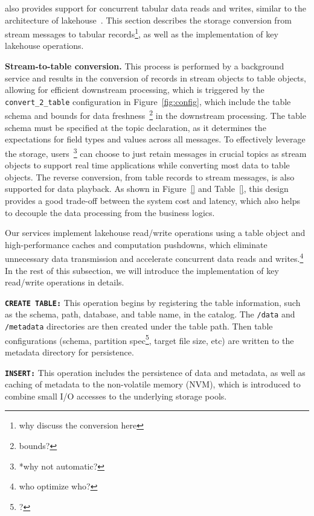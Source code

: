  \sys also provides support for concurrent tabular data reads and writes, similar to  the architecture of lakehouse~\cite{}.
  This section  describes the storage conversion from stream messages to tabular records\footnote{why discuss the conversion here}, as well as the implementation of key lakehouse operations.


\noindent \textbf{Stream-to-table conversion.} This process is performed by a background service and results in the conversion of records in stream objects to table objects, allowing for efficient downstream processing, which is triggered by the \texttt{convert\_2\_table} configuration in Figure~\ref{fig:config}, which include the table schema and bounds for data freshness~\footnote{bounds?} in the downstream processing.  The table schema must be specified at the topic declaration, as it determines the expectations for field types and values across all messages.  To effectively leverage the storage, users~\footnote{*why not automatic?} can choose to just retain messages in crucial topics as stream objects  to support real time applications while converting most  data to table objects.  The reverse conversion, from table records to stream messages, is also supported for data playback. As shown in Figure~\ref{} and Table~\ref{}, this design provides a good trade-off  between the system cost and latency, which also  helps to decouple the data processing from the business logics.



Our \sys services implement lakehouse read/write operations using a table object and high-performance caches and computation pushdowns, which eliminate unnecessary data transmission and accelerate concurrent data reads and writes.\footnote{who optimize who?} In the rest of this subsection, we will introduce the implementation of key read/write operations in details.

\noindent \textbf{\texttt{CREATE TABLE:}} This operation begins by registering the table information, such as the schema, path, database, and table name, in the catalog. The \texttt{/data} and \texttt{/metadata} directories are then created under the table path. Then table configurations (schema, partition spec\footnote{?}, target file size, etc) are written to the metadata directory for persistence.



\noindent \textbf{\texttt{INSERT:}} This operation includes the persistence of data and metadata, as well as caching of metadata to the non-volatile memory (NVM), which is introduced to combine small I/O accesses to the underlying storage pools.

